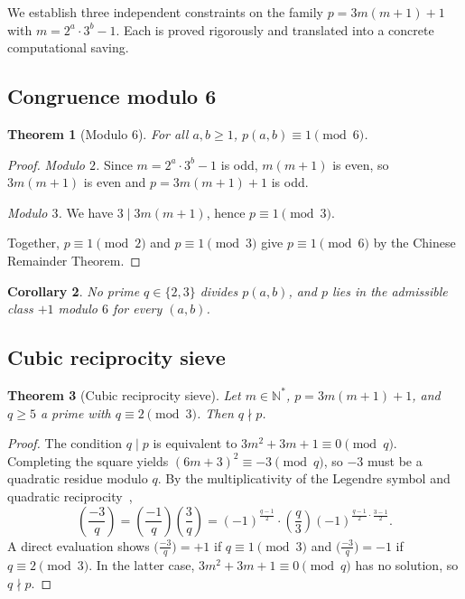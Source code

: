 \documentclass[11pt,a4paper]{article}
\newtheorem{theorem}{Theorem}[section]
\newtheorem{corollary}[theorem]{Corollary}
\theoremstyle{definition}
\theoremstyle{remark}
\newcommand{\N}{\mathbb{N}}
\newcommand{\Leg}[2]{\left(\dfrac{#1}{#2}\right)}
\begin{document}
We establish three independent constraints on the family
$p = 3m(m+1)+1$ with $m = 2^a\cdot 3^b-1$. Each is proved rigorously
and translated into a concrete computational saving.

\subsection{Congruence modulo 6}

\begin{rigorousbox}
\begin{theorem}[Modulo $6$]\label{thm:mod6}
For all $a,b\geq 1$, $p(a,b)\equiv 1\pmod{6}$.
\end{theorem}
\end{rigorousbox}

\begin{proof}
\textit{Modulo $2$.} Since $m = 2^a\cdot 3^b-1$ is odd, $m(m+1)$ is even,
so $3m(m+1)$ is even and $p = 3m(m+1)+1$ is odd.

\textit{Modulo $3$.} We have $3\mid 3m(m+1)$, hence $p\equiv 1\pmod{3}$.

Together, $p\equiv 1\pmod{2}$ and $p\equiv 1\pmod{3}$ give
$p\equiv 1\pmod{6}$ by the Chinese Remainder Theorem.
\end{proof}

\begin{corollary}
No prime $q\in\{2,3\}$ divides $p(a,b)$, and $p$ lies in the admissible
class $+1$ modulo $6$ for every $(a,b)$.
\end{corollary}

\subsection{Cubic reciprocity sieve}

\begin{rigorousbox}
\begin{theorem}[Cubic reciprocity sieve]\label{thm:cubic}
Let $m\in\N^*$, $p = 3m(m+1)+1$, and $q\geq 5$ a prime with
$q\equiv 2\pmod{3}$. Then $q\nmid p$.
\end{theorem}
\end{rigorousbox}

\begin{proof}
The condition $q\mid p$ is equivalent to $3m^2+3m+1\equiv 0\pmod{q}$.
Completing the square yields $(6m+3)^2\equiv -3\pmod{q}$, so $-3$ must be
a quadratic residue modulo $q$. By the multiplicativity of the Legendre
symbol and quadratic reciprocity~\cite{IrelandRosen},
\[
  \Leg{-3}{q} = \Leg{-1}{q}\Leg{3}{q}
  = (-1)^{\frac{q-1}{2}}\cdot\Leg{q}{3}(-1)^{\frac{q-1}{2}\cdot\frac{3-1}{2}}.
\]
A direct evaluation shows $\bigl(\tfrac{-3}{q}\bigr)=+1$ if $q\equiv 1\pmod{3}$
and $\bigl(\tfrac{-3}{q}\bigr)=-1$ if $q\equiv 2\pmod{3}$. In the latter case,
$3m^2+3m+1\equiv 0\pmod{q}$ has no solution, so $q\nmid p$.
\end{proof}
\end{document}
